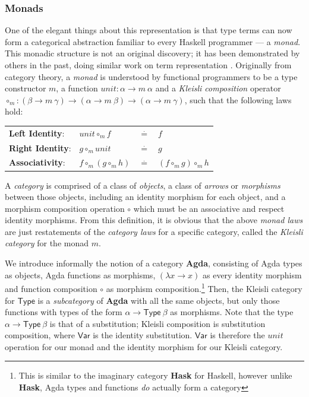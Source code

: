 \documentclass[a4paper]{jfp}
\begin{document}
\subsubsection{Monads}

One of the elegant things about this representation is that type terms can now form a categorical abstraction familiar to every Haskell programmer --- a
\emph{monad}. This monadic structure is not an original discovery; it has been demonstrated by others in the past, doing similar work on term
representation \cite{Bird:1999:DBN:968699.968702, Bellegarde:1994:SFM:202774.202788}.  Originally from category theory, a \emph{monad} is understood
by functional programmers to be a type constructor $m$, a function $unit : \alpha \rightarrow m\ \alpha$ and a \emph{Kleisli composition} operator
$\circ_m : (\beta \rightarrow m\ \gamma) \rightarrow (\alpha \rightarrow m\ \beta) \rightarrow (\alpha \rightarrow m\ \gamma)$, such that the
following laws hold:

\begin{tabular}{llll}
      \textbf{Left Identity}: & $unit \circ_m f $&$\stackrel{\cdot}{=}$&$ f$\\
      \textbf{Right Identity}:& $g \circ_m unit $&$\stackrel{\cdot}{=}$&$ g$\\
      \textbf{Associativity}: & $f \circ_m (g \circ_m h) $&$\stackrel{\cdot}{=}$&$ (f \circ_m g) \circ_m h$\\
\end{tabular}

A \emph{category} is comprised of a class of \emph{objects}, a class of \emph{arrows} or \emph{morphisms} between those objects, including an
identity morphism for each object,  and a morphism composition operation $\circ$ which must be an associative and respect identity
morphisms. From this definition, it is obvious that the above \emph{monad laws} are just restatements of the \emph{category laws} for a specific
category, called the \emph{Kleisli category} for the monad $m$. 

We introduce informally the notion of a category \textbf{Agda}, consisting of Agda types as objects, Agda functions as morphisms, $(\lambda x
\rightarrow x)$ as every identity morphism and function composition $\circ$ as morphism composition.\footnote{This is similar to the imaginary
   category \textbf{Hask} for Haskell, however unlike \textbf{Hask}, Agda types and functions \emph{do} actually form a category} Then, the Kleisli
category for $\textsf{Type}$ is a \emph{subcategory} of \textbf{Agda} with all the same objects, but only those functions with types of the form
$\alpha \rightarrow \textsf{Type}\ \beta$ as morphisms. Note that the type $\alpha \rightarrow \textsf{Type}\ \beta$ is that of a substitution;
Kleisli composition is substitution composition, where $\textsf{Var}$ is the identity substitution. $\textsf{Var}$ is therefore the $\mathit{unit}$
operation for our monad and the identity morphism for our Kleisli category.
\end{document}
